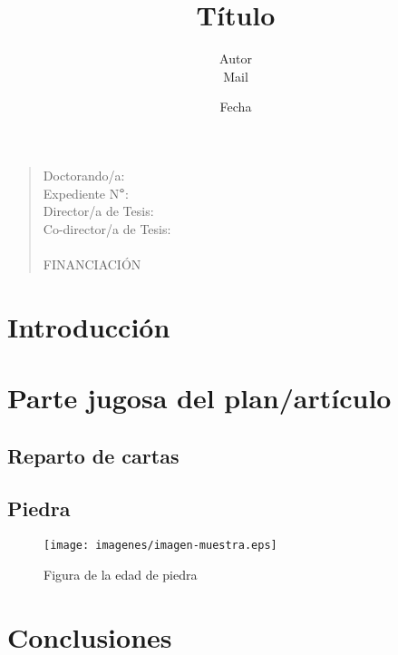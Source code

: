 \documentclass[a4paper, 12pt, twoside]{article} %
\title{Título}
\date{Fecha}
\author{Autor \\ Mail \\}
\begin{document}
\maketitle

\begin{quote}
Doctorando/a: \\
Expediente N$\degree$: \\
Director/a de Tesis: \\
Co-director/a de Tesis: \\
\\
FINANCIACIÓN
\end{quote}

\section{Introducción}

\cite{Abney:1987nounphrase}

\section{Parte jugosa del plan/artículo}
\subsection{Reparto de cartas}

\subsection{Piedra}

\begin{center}\begin{figure}\texttt{[image: imagenes/imagen-muestra.eps]}\caption{Figura de la edad de piedra}\end{figure}\end{center}

\section{Conclusiones}



%
%


\end{document}
